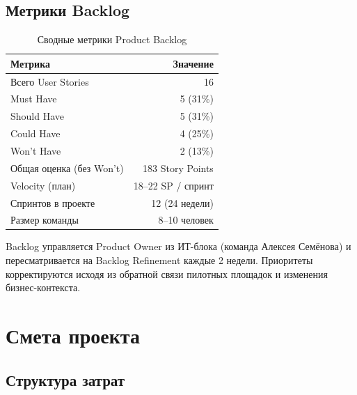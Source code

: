 \documentclass[12pt,a4paper]{article}
\begin{document}
\subsection{Метрики Backlog}

\begin{table}[H]
\centering
\caption{Сводные метрики Product Backlog}
\label{tab:backlog_metrics}
\begin{tabular}{lr}
\toprule
\textbf{Метрика} & \textbf{Значение} \\
\midrule
Всего User Stories & 16 \\
Must Have & 5 (31\%) \\
Should Have & 5 (31\%) \\
Could Have & 4 (25\%) \\
Won't Have & 2 (13\%) \\
\midrule
Общая оценка (без Won't) & 183 Story Points \\
Velocity (план) & 18--22 SP / спринт \\
Спринтов в проекте & 12 (24 недели) \\
Размер команды & 8--10 человек \\
\bottomrule
\end{tabular}
\end{table}

Backlog управляется Product Owner из ИТ-блока (команда Алексея Семёнова) и пересматривается на Backlog Refinement каждые 2 недели. Приоритеты корректируются исходя из обратной связи пилотных площадок и изменения бизнес-контекста.

\newpage

\section{Смета проекта}

\subsection{Структура затрат}
\end{document}
